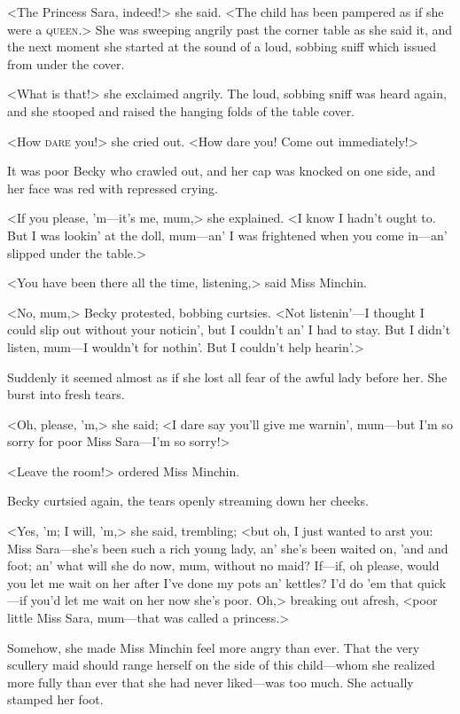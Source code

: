 <The Princess Sara, indeed!> she said. <The child has been pampered as if she were a \textsc{queen}.> She was sweeping angrily past the corner table as she said it, and the next moment she started at the sound of a loud, sobbing sniff which issued from under the cover.

<What is that!> she exclaimed angrily. The loud, sobbing sniff was heard again, and she stooped and raised the hanging folds of the table cover.

<How \textsc{dare} you!> she cried out. <How dare you! Come out immediately!>

It was poor Becky who crawled out, and her cap was knocked on one side, and her face was red with repressed crying.

<If you please, 'm—it's me, mum,> she explained. <I know I hadn't ought to. But I was lookin' at the doll, mum—an' I was frightened when you come in—an' slipped under the table.>

<You have been there all the time, listening,> said Miss Minchin.

<No, mum,> Becky protested, bobbing curtsies. <Not listenin'—I thought I could slip out without your noticin', but I couldn't an' I had to stay. But I didn't listen, mum—I wouldn't for nothin'. But I couldn't help hearin'.>

Suddenly it seemed almost as if she lost all fear of the awful lady before her. She burst into fresh tears.

<Oh, please, 'm,> she said; <I dare say you'll give me warnin', mum—but I'm so sorry for poor Miss Sara—I'm so sorry!>

<Leave the room!> ordered Miss Minchin.

Becky curtsied again, the tears openly streaming down her cheeks.

<Yes, 'm; I will, 'm,> she said, trembling; <but oh, I just wanted to arst you: Miss Sara—she's been such a rich young lady, an' she's been waited on, 'and and foot; an' what will she do now, mum, without no maid? If—if, oh please, would you let me wait on her after I've done my pots an' kettles? I'd do 'em that quick—if you'd let me wait on her now she's poor. Oh,> breaking out afresh, <poor little Miss Sara, mum—that was called a princess.>

Somehow, she made Miss Minchin feel more angry than ever. That the very scullery maid should range herself on the side of this child—whom she realized more fully than ever that she had never liked—was too much. She actually stamped her foot.

